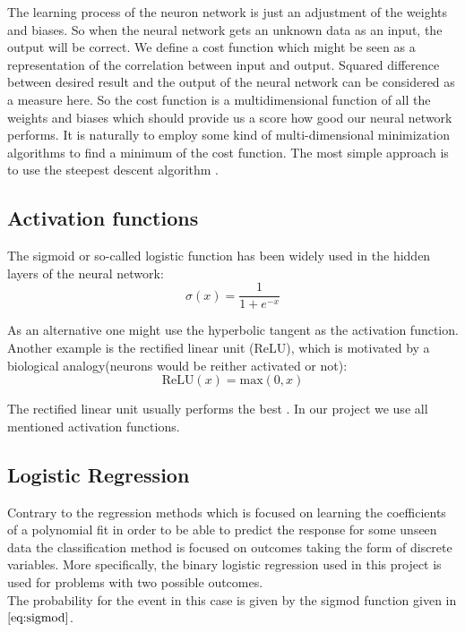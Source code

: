 \documentclass[10pt]{article}
\begin{document}
The learning process of the neuron network is just an adjustment of the weights and biases. So when the neural network gets an unknown data as an input, the output will be correct. We define a cost function which might be seen as a representation of the correlation between input and output. Squared difference between desired result and the output of the neural network can be considered as a measure here. So the cost function is a multidimensional function of all the weights and biases which should provide us a score how good our neural network performs. It is naturally to employ some kind of multi-dimensional minimization algorithms to find a minimum of the cost function. The most simple approach is to use the steepest descent algorithm \cite{Metha}.


\subsection{Activation functions}
The sigmoid or so-called logistic function has been widely used
in the hidden layers of the neural network:
\begin{equation}\label{eq:sigmod}
\sigma (x) = \frac{1}{1 + e^{-x}}
\end{equation}

As an alternative one might use the hyperbolic tangent as the activation function. Another example is the rectified linear unit (ReLU), which is motivated by a biological analogy(neurons would be reither activated or not):
\begin{equation*}
\text{ReLU} (x) = \text{max}(0,x)
\end{equation*}

The rectified linear unit usually performs the best \cite{Metha}. In our project we use all mentioned activation functions.



\subsection{Logistic Regression}
Contrary to the regression methods which is focused on learning the coefficients of a polynomial fit in order to be able to predict the response for some unseen data the classification method is focused on outcomes taking the form of discrete variables. More specifically, the binary logistic regression used in this project is used for problems with two possible outcomes. \\
The probability for the event in this case is given by the sigmod function given in $\ref{eq:sigmod}$. 
\end{document}
